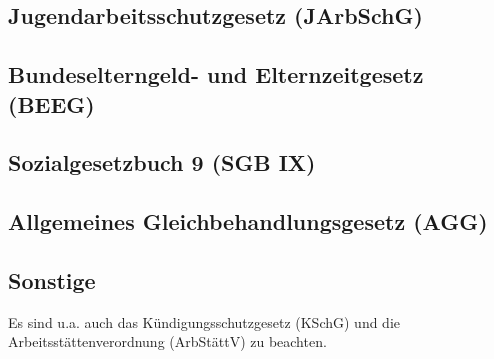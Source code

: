 \subsection{Jugendarbeitsschutzgesetz (JArbSchG)}

\subsection{Bundeselterngeld- und Elternzeitgesetz (BEEG)}

\subsection{Sozialgesetzbuch 9 (SGB IX)}

\subsection{Allgemeines Gleichbehandlungsgesetz (AGG)}

\subsection{Sonstige}

Es sind u.a. auch das Kündigungsschutzgesetz (KSchG) und die Arbeitsstättenverordnung (ArbStättV) zu beachten.